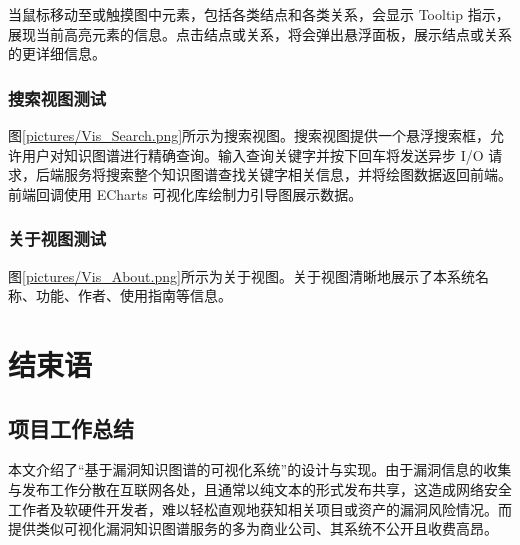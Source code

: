 \documentclass[a4paper,AutoFakeBold,oneside,12pt]{book}
\begin{document}
当鼠标移动至或触摸图中元素，包括各类结点和各类关系，会显示 Tooltip 指示，展现当前高亮元素的信息。点击结点或关系，将会弹出悬浮面板，展示结点或关系的更详细信息。


\subsection{搜索视图测试}

图\ref{pictures/Vis_Search.png}所示为搜索视图。搜索视图提供一个悬浮搜索框，允许用户对知识图谱进行精确查询。输入查询关键字并按下回车将发送异步 I/O 请求，后端服务将搜索整个知识图谱查找关键字相关信息，并将绘图数据返回前端。前端回调使用 ECharts 可视化库绘制力引导图展示数据。




\subsection{关于视图测试}

图\ref{pictures/Vis_About.png}所示为关于视图。关于视图清晰地展示了本系统名称、功能、作者、使用指南等信息。


\chapter{结束语}

\section{项目工作总结}

本文介绍了``基于漏洞知识图谱的可视化系统''的设计与实现。由于漏洞信息的收集与发布工作分散在互联网各处，且通常以纯文本的形式发布共享，这造成网络安全工作者及软硬件开发者，难以轻松直观地获知相关项目或资产的漏洞风险情况。而提供类似可视化漏洞知识图谱服务的多为商业公司、其系统不公开且收费高昂。
\end{document}
